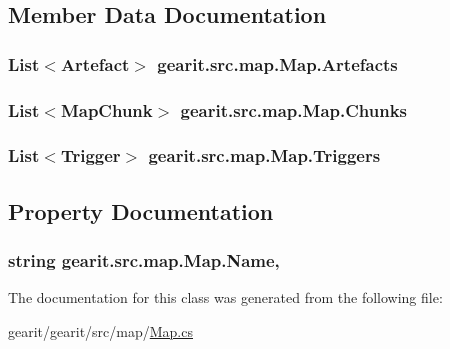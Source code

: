 \subsection{Member Data Documentation}
\hypertarget{classgearit_1_1src_1_1map_1_1_map_a5c13ea5c8712d296b450fdc90376e75c}{
\subsubsection[{Artefacts}]{\setlength{\rightskip}{0pt plus 5cm}List$<${\bf Artefact}$>$ gearit.\+src.\+map.\+Map.\+Artefacts}}\label{classgearit_1_1src_1_1map_1_1_map_a5c13ea5c8712d296b450fdc90376e75c}
\hypertarget{classgearit_1_1src_1_1map_1_1_map_a2f224448cfe74111f67cbac2ef5eb862}{
\subsubsection[{Chunks}]{\setlength{\rightskip}{0pt plus 5cm}List$<${\bf Map\+Chunk}$>$ gearit.\+src.\+map.\+Map.\+Chunks}}\label{classgearit_1_1src_1_1map_1_1_map_a2f224448cfe74111f67cbac2ef5eb862}
\hypertarget{classgearit_1_1src_1_1map_1_1_map_a956469edb846fff301c908e8bf38677b}{
\subsubsection[{Triggers}]{\setlength{\rightskip}{0pt plus 5cm}List$<${\bf Trigger}$>$ gearit.\+src.\+map.\+Map.\+Triggers}}\label{classgearit_1_1src_1_1map_1_1_map_a956469edb846fff301c908e8bf38677b}


\subsection{Property Documentation}
\hypertarget{classgearit_1_1src_1_1map_1_1_map_a25a011fb58f57941c24e3c80207e2b21}{
\subsubsection[{Name}]{\setlength{\rightskip}{0pt plus 5cm}string gearit.\+src.\+map.\+Map.\+Name\hspace{0.3cm}{\ttfamily [get]}, {\ttfamily [set]}}}\label{classgearit_1_1src_1_1map_1_1_map_a25a011fb58f57941c24e3c80207e2b21}


The documentation for this class was generated from the following file\+:\begin{DoxyCompactItemize}
\item 
gearit/gearit/src/map/\hyperlink{_map_8cs}{Map.\+cs}\end{DoxyCompactItemize}

